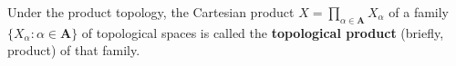 Under the product topology, the Cartesian product $X = \prod_{\alpha \in \mathbf{A}} X_\alpha$ of a family $\{X_\alpha : \alpha \in \mathbf{A}\}$ of topological spaces is called the \textbf{topological product} (briefly, product) of that family.
